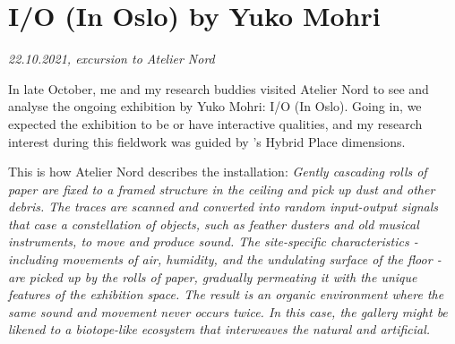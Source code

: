 \section{I/O (In Oslo) by Yuko Mohri}
\par
\emph{22.10.2021, excursion to Atelier Nord}
\par

In late October, me and my research buddies visited Atelier Nord to see and analyse the ongoing exhibition by Yuko Mohri: I/O (In Oslo). Going in, we expected the exhibition to be or have interactive qualities, and my research interest during this fieldwork was guided by \autocite{hybridplace_ciolfi}'s Hybrid Place dimensions. 

This is how Atelier Nord describes the installation: 
\emph{Gently cascading rolls of paper are fixed to a framed structure in the ceiling and pick up dust and other debris. The traces are scanned and converted into random input-output signals that case a constellation of objects, such as feather dusters and old musical instruments, to move and produce sound. The site-specific characteristics - including movements of air, humidity, and the undulating surface of the floor - are picked up by the rolls of paper, gradually permeating it with the unique features of the exhibition space. The result is an organic environment where the same sound and movement never occurs twice. In this case, the gallery might be likened to a biotope-like ecosystem that interweaves the natural and artificial.} \autocite{yukomohri_web}

